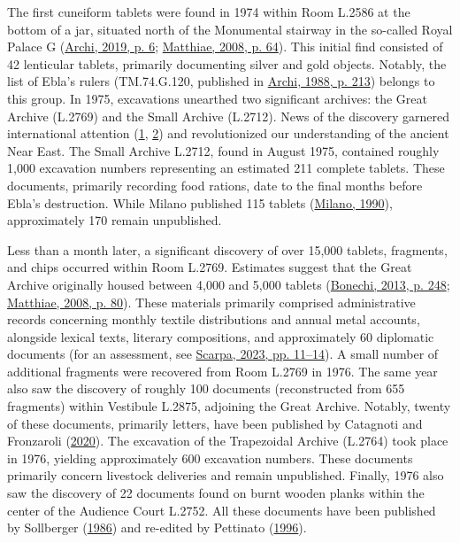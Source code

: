 \documentclass[
]{book}
\begin{document}
The first cuneiform tablets were found in 1974 within Room L.2586 at the bottom of a jar, situated north of the Monumental stairway in the so-called Royal Palace G (\protect\hyperlink{ref-Archi2019d}{Archi, 2019, p. 6}; \protect\hyperlink{ref-Matthiae2008a}{Matthiae, 2008, p. 64}). This initial find consisted of 42 lenticular tablets, primarily documenting silver and gold objects. Notably, the list of Ebla's rulers (TM.74.G.120, published in \protect\hyperlink{ref-Archi1988b}{Archi, 1988, p. 213}) belongs to this group. In 1975, excavations unearthed two significant archives: the Great Archive (L.2769) and the Small Archive (L.2712). News of the discovery garnered international attention (\href{https://archivio.unita.news/assets/main/1976/03/16/page_003.pdf}{1}, \href{https://www.nytimes.com/1976/10/25/archives/discovey-of-an-ancient-city-in-syria-called-sensational.html}{2}) and revolutionized our understanding of the ancient Near East. The Small Archive L.2712, found in August 1975, contained roughly 1,000 excavation numbers representing an estimated 211 complete tablets. These documents, primarily recording food rations, date to the final months before Ebla's destruction. While Milano published 115 tablets (\protect\hyperlink{ref-Milano1990a}{Milano, 1990}), approximately 170 remain unpublished.

Less than a month later, a significant discovery of over 15,000 tablets, fragments, and chips occurred within Room L.2769. Estimates suggest that the Great Archive originally housed between 4,000 and 5,000 tablets (\protect\hyperlink{ref-Bonechi2013}{Bonechi, 2013, p. 248}; \protect\hyperlink{ref-Matthiae2008a}{Matthiae, 2008, p. 80}). These materials primarily comprised administrative records concerning monthly textile distributions and annual metal accounts, alongside lexical texts, literary compositions, and approximately 60 diplomatic documents (for an assessment, see \protect\hyperlink{ref-Scarpa2023}{Scarpa, 2023, pp. 11--14}).
A small number of additional fragments were recovered from Room L.2769 in 1976. The same year also saw the discovery of roughly 100 documents (reconstructed from 655 fragments) within Vestibule L.2875, adjoining the Great Archive. Notably, twenty of these documents, primarily letters, have been published by Catagnoti and Fronzaroli (\protect\hyperlink{ref-CatagnotiFronzaroli2020}{2020}).
The excavation of the Trapezoidal Archive (L.2764) took place in 1976, yielding approximately 600 excavation numbers. These documents primarily concern livestock deliveries and remain unpublished. Finally, 1976 also saw the discovery of 22 documents found on burnt wooden planks within the center of the Audience Court L.2752. All these documents have been published by Sollberger (\protect\hyperlink{ref-Sollberger1986}{1986}) and re-edited by Pettinato (\protect\hyperlink{ref-Pettinato1996a}{1996}).
\end{document}
